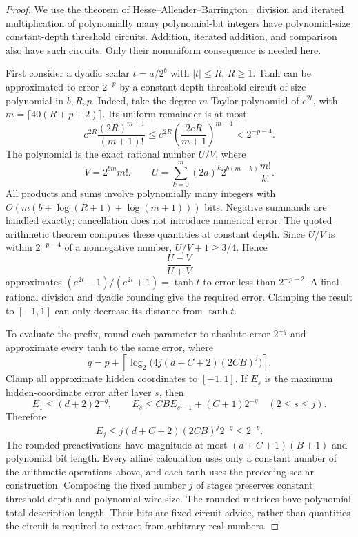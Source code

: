 \begin{proof}
We use the theorem of Hesse--Allender--Barrington
\cite{hesse2002}: division and iterated multiplication of polynomially
many polynomial-bit integers have polynomial-size constant-depth
threshold circuits. Addition, iterated addition, and comparison also
have such circuits. Only their nonuniform consequence is needed here.

First consider a dyadic scalar $t=a/2^b$ with $|t|\le R$, $R\ge1$.
Tanh can be approximated to error $2^{-p}$ by a constant-depth
threshold circuit of size polynomial in $b,R,p$. Indeed, take the
degree-$m$ Taylor polynomial of $e^{2t}$, with
$m=\lceil40(R+p+2)\rceil$. Its uniform remainder is at most
\[
 e^{2R}\frac{(2R)^{m+1}}{(m+1)!}
 \le e^{2R}\left(\frac{2eR}{m+1}\right)^{m+1}
 <2^{-p-4}.
\]
The polynomial is the exact rational number $U/V$, where
\[
 V=2^{bm}m!,\qquad
 U=\sum_{k=0}^m (2a)^k2^{b(m-k)}\frac{m!}{k!}.
\]
All products and sums involve polynomially many integers with
$O(m(b+\log(R+1)+\log(m+1)))$ bits. Negative summands are handled
exactly; cancellation does not introduce numerical error.
The quoted arithmetic theorem computes these quantities at constant
depth. Since $U/V$ is within $2^{-p-4}$ of a nonnegative number,
$U/V+1\ge3/4$. Hence
\[
 \frac{U-V}{U+V}
\]
approximates $(e^{2t}-1)/(e^{2t}+1)=\tanh t$ to error less than
$2^{-p-2}$. A final rational division and dyadic rounding give the
required error. Clamping the result to $[-1,1]$ can only decrease its
distance from $\tanh t$.

To evaluate the prefix, round each parameter to absolute error
$2^{-q}$ and approximate every tanh to the same error, where
\[
 q=p+\left\lceil\log_2\bigl(4j(d+C+2)(2CB)^j\bigr)\right\rceil.
\]
Clamp all approximate hidden coordinates to $[-1,1]$.
If $E_s$ is the maximum hidden-coordinate error after layer $s$, then
\[
 E_1\le(d+2)2^{-q},\qquad
 E_s\le CB E_{s-1}+(C+1)2^{-q}\quad(2\le s\le j).
\]
Therefore
\[
 E_j\le j(d+C+2)(2CB)^j2^{-q}\le2^{-p}.
\]
The rounded preactivations have magnitude at most
$(d+C+1)(B+1)$ and polynomial bit length. Every affine calculation
uses only a constant number of the arithmetic operations above, and
each tanh uses the preceding scalar construction. Composing the fixed
number $j$ of stages preserves constant threshold depth and polynomial
wire size. The rounded matrices have polynomial total description
length. Their bits are fixed circuit advice, rather than quantities
the circuit is required to extract from arbitrary real numbers.
\end{proof}

